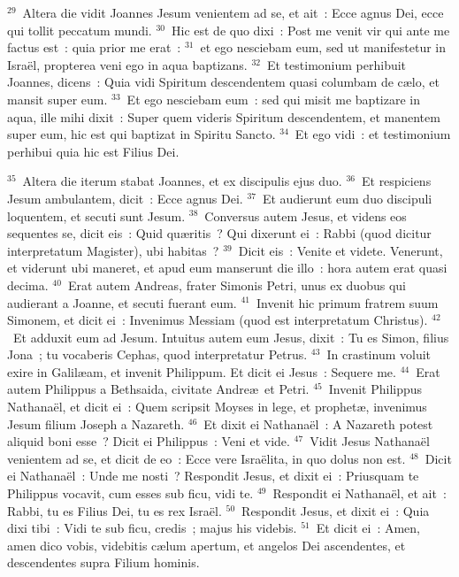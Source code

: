 ${}^{29}$~Altera die vidit Joannes Jesum venientem ad se, et ait~: Ecce agnus Dei, ecce qui tollit peccatum mundi.
${}^{30}$~Hic est de quo dixi~: Post me venit vir qui ante me factus est~: quia prior me erat~:
${}^{31}$~et ego nesciebam eum, sed ut manifestetur in Isra\"el, propterea veni ego in aqua baptizans.
${}^{32}$~Et testimonium perhibuit Joannes, dicens~: Quia vidi Spiritum descendentem quasi columbam de c\ae lo, et mansit super eum.
${}^{33}$~Et ego nesciebam eum~: sed qui misit me baptizare in aqua, ille mihi dixit~: Super quem videris Spiritum descendentem, et manentem super eum, hic est qui baptizat in Spiritu Sancto.
${}^{34}$~Et ego vidi~: et testimonium perhibui quia hic est Filius Dei.


${}^{35}$~Altera die iterum stabat Joannes, et ex discipulis ejus duo.
${}^{36}$~Et respiciens Jesum ambulantem, dicit~: Ecce agnus Dei.
${}^{37}$~Et audierunt eum duo discipuli loquentem, et secuti sunt Jesum.
${}^{38}$~Conversus autem Jesus, et videns eos sequentes se, dicit eis~: Quid qu\ae ritis~? Qui dixerunt ei~: Rabbi (quod dicitur interpretatum Magister), ubi habitas~?
${}^{39}$~Dicit eis~: Venite et videte. Venerunt, et viderunt ubi maneret, et apud eum manserunt die illo~: hora autem erat quasi decima.
${}^{40}$~Erat autem Andreas, frater Simonis Petri, unus ex duobus qui audierant a Joanne, et secuti fuerant eum.
${}^{41}$~Invenit hic primum fratrem suum Simonem, et dicit ei~: Invenimus Messiam (quod est interpretatum Christus).
${}^{42}$~Et adduxit eum ad Jesum. Intuitus autem eum Jesus, dixit~: Tu es Simon, filius Jona~; tu vocaberis Cephas, quod interpretatur Petrus.
${}^{43}$~In crastinum voluit exire in Galil\ae am, et invenit Philippum. Et dicit ei Jesus~: Sequere me.
${}^{44}$~Erat autem Philippus a Bethsaida, civitate Andre\ae\ et Petri.
${}^{45}$~Invenit Philippus Nathana\"el, et dicit ei~: Quem scripsit Moyses in lege, et prophet\ae , invenimus Jesum filium Joseph a Nazareth.
${}^{46}$~Et dixit ei Nathana\"el~: A Nazareth potest aliquid boni esse~? Dicit ei Philippus~: Veni et vide.
${}^{47}$~Vidit Jesus Nathana\"el venientem ad se, et dicit de eo~: Ecce vere Isra\"elita, in quo dolus non est.
${}^{48}$~Dicit ei Nathana\"el~: Unde me nosti~? Respondit Jesus, et dixit ei~: Priusquam te Philippus vocavit, cum esses sub ficu, vidi te.
${}^{49}$~Respondit ei Nathana\"el, et ait~: Rabbi, tu es Filius Dei, tu es rex Isra\"el.
${}^{50}$~Respondit Jesus, et dixit ei~: Quia dixi tibi~: Vidi te sub ficu, credis~; majus his videbis.
${}^{51}$~Et dicit ei~: Amen, amen dico vobis, videbitis c\ae lum apertum, et angelos Dei ascendentes, et descendentes supra Filium hominis.
